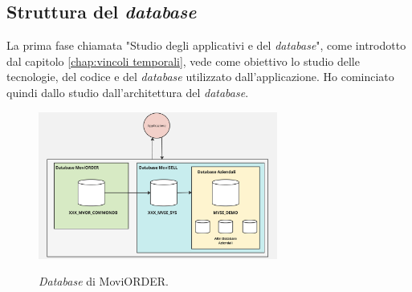 \subsection{Struttura del \textit{database}}\label{chap:struttura database}
La prima fase chiamata "Studio degli applicativi e del \textit{database}", come introdotto dal capitolo \ref{chap:vincoli temporali}, 
vede come obiettivo lo studio delle tecnologie, del codice e del \textit{database} utilizzato dall'applicazione. Ho cominciato quindi 
dallo studio dall'architettura del \textit{database}.\\

\begin{figure}[H]
    \centering
    \includegraphics[alt={\textit{Database} di MoviORDER}, width=0.7\textwidth]{img/database.png}
    \caption {\textit{Database} di MoviORDER.}
    \label{fig:database}
\end{figure}


